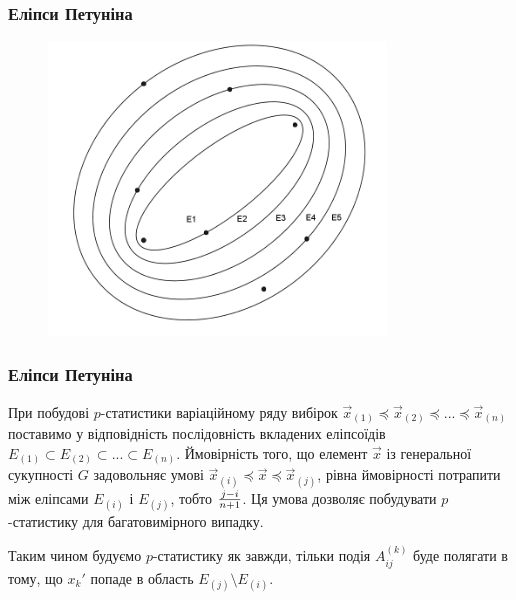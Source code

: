\documentclass[mathserif,serif,10pt]{beamer}
\begin{document}
\begin{frame}
\frametitle{Еліпси Петуніна}
\begin{figure}[h!]
\centering
\includegraphics[width=0.8\textwidth]{pet3}
\end{figure}
\end{frame}

\begin{frame}
\frametitle{Еліпси Петуніна}
При побудові $p$-статистики варіаційному ряду вибірок
$\overrightarrow{x}_{(1)} \preceq \overrightarrow{x}_{(2)} \preceq
... \preceq \overrightarrow{x}_{(n)}$ поставимо у відповідність послідовність
вкладених еліпсоїдів $E_{(1)} \subset E_{(2)} \subset ... \subset E_{(n)}$. Ймовірність того, що елемент $\overrightarrow{x}$ із генеральної сукупності $G$ задовольняє умові $\overrightarrow{x}_{(i)} \preceq \overrightarrow{x} \preceq
\overrightarrow{x}_{(j)}$, рівна ймовірності потрапити між еліпсами $E_{(i)}$ і $E_{(j)}$, тобто $j-i \over n+1$. Ця умова дозволяє побудувати $p$-статистику для багатовимірного випадку. \par
Таким чином будуємо $p$-статистику як завжди, тільки подія $A_{ij}^{(k)}$ буде полягати в тому, що $x_k'$ попаде в область $E_{(j)} \setminus E_{(i)}$.
\end{frame}
\end{document}
